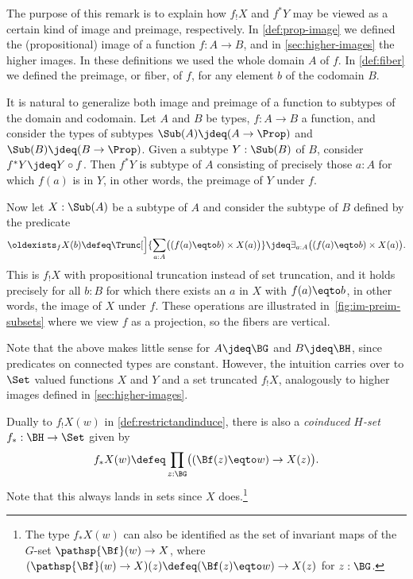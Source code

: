 \begin{remark}\label{rem:^*-_!-as-(pre)image}
The purpose of this remark is to explain how
$f_!X$ and $f^*Y$ may be viewed as a certain kind of
image and preimage, respectively. In \cref{def:prop-image}
we defined the (propositional) image of a function $f:A\to B$,
and in \cref{sec:higher-images} the higher images. In these
definitions we used the whole domain $A$ of $f$.
In \cref{def:fiber} we defined the preimage, or fiber, of $f$,
for any element $b$ of the codomain $B$.

It is natural to generalize both image and preimage of
a function to subtypes of
the domain and codomain. Let $A$ and $B$ be types, $f:A\to B$
a function, and consider the types of subtypes $\Sub(A)\jdeq(A\to\Prop)$
and $\Sub(B)\jdeq(B\to\Prop)$. Given a subtype $Y:\Sub(B)$ of $B$,
consider $f^*Y \jdeq Y\circ f$. Then $f^*Y$ is subtype of $A$
consisting of precisely those $a:A$ for which $f(a)$ is in $Y$,
in other words, the preimage of $Y$ under $f$.

Now let $X:\Sub(A)$ be a subtype of $A$ and consider the subtype of
$B$ defined by the predicate
\[
  \oldexists_fX (b) \defeq \Trunc[\Big]{\sum_{a:A}\bigl((f(a) \eqto b)\times X(a)\bigr)}
  \jdeq \exists_{a:A}\bigl((f(a) \eqto b)\times X(a)\bigr).
\]
This is $f_!X$ with propositional truncation instead of set truncation,
and it holds precisely for all $b:B$ for which there
exists an $a$ in $X$ with $f(a)\eqto b$,
in other words, the image of $X$ under $f$.
These operations are illustrated in~\cref{fig:im-preim-subsets}
where we view $f$ as a projection, so the fibers are vertical.

Note that the above makes little sense for $A\jdeq\BG$ and $B\jdeq\BH$,
since predicates on connected types are constant. However, the intuition
carries over to $\Set$ valued functions $X$ and $Y$ and a set truncated
$f_!X$, analogously to higher images defined in \cref{sec:higher-images}.
\end{remark}

\begin{remark}\label{rem:coinduced-Hset}
  Dually to $f_!X(w)$ in \cref{def:restrictandinduce},
  there is also a \emph{coinduced $H$-set}
  $f_*:\BH\to\Set$ given by
  \[
    f_*X(w)\defeq\prod_{z:\BG}\bigl((\Bf(z)\eqto w) \to X(z)\bigr).
  \]
  Note that this always lands in sets since $X$ does.\footnote{%
The type $f_*X(w)$ can also be identified
as the set of invariant maps of the $G$-set $\pathsp{\Bf}(w)\to X$,
where $(\pathsp{\Bf}(w)\to X)(z) \defeq (\Bf(z) \eqto w)\to X(z)$ for $z:\BG$.}
\end{remark}

